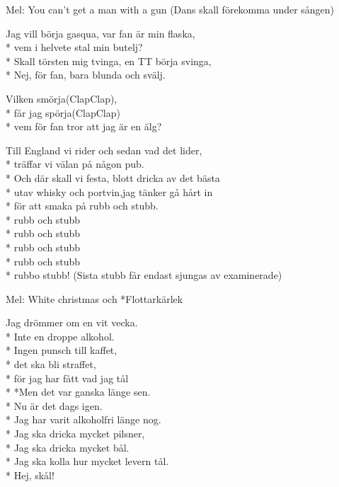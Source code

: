 \begin{SongText}
    \begin{SongInfo}
        Mel: You can’t get a man with a gun
        (Dans skall förekomma under sången)
    \end{SongInfo}
    \begin{SongVerse}
        Jag vill börja gasqua, var fan är min flaska,\\*%
        vem i helvete stal min butelj?\\*%
        Skall törsten mig tvinga, en TT börja svinga,\\*%
        Nej, för fan, bara blunda och svälj.
    \end{SongVerse}
    \begin{SongVerse}
        Vilken smörja(ClapClap),\\*%
        får jag spörja(ClapClap)\\*%
        vem för fan tror att jag är en älg?
    \end{SongVerse}
    \begin{SongVerse}
        Till England vi rider och sedan vad det lider,\\*%
        träffar vi välan på någon pub.\\*%
        Och där skall vi festa, blott dricka av det bästa\\*%
        utav whisky och portvin,jag tänker gå hårt in\\*%
        för att smaka på rubb och stubb.\\*%
        rubb och stubb\\*%
        rubb och stubb\\*%
        rubb och stubb\\*%
        rubb och stubb\\*%
        rubbo stubb! (Sista stubb får endast sjungas av
        examinerade)
    \end{SongVerse}
\end{SongText}
\begin{SongText}
    \begin{SongInfo}
        Mel: White christmas och *Flottarkärlek
    \end{SongInfo}
    \begin{SongVerse}
        Jag drömmer om en vit vecka.\\*%
        Inte en droppe alkohol.\\*%
        Ingen punsch till kaffet,\\*%
        det ska bli straffet,\\*%
        för jag har fått vad jag tål\\*%
        *Men det var ganska länge sen.\\*%
        Nu är det dags igen.\\*%
        Jag har varit alkoholfri länge nog.\\*%
        Jag ska dricka mycket pilsner,\\*%
        Jag ska dricka mycket bål.\\*%
        Jag ska kolla hur mycket levern tål.\\*%
        Hej, skål!
    \end{SongVerse}
\end{SongText}
